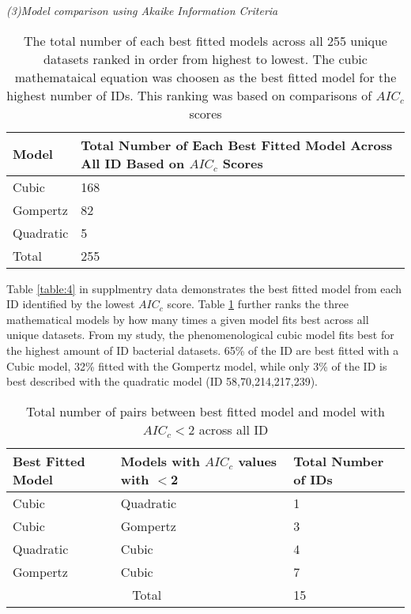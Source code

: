 \documentclass[11pt]{article}
\begin{document}
\noindent\emph{(3)Model comparison using Akaike Information Criteria}

    \begin{table}[htb]
        \caption{The total number of each best fitted models across all 255 unique datasets ranked in order from highest to lowest. The cubic mathemataical equation was
        choosen as the best fitted model for the highest number of IDs. This ranking was based on comparisons of $AIC_{c}$ scores}
        \centering 
        \begin{tabular}{ | m{3cm} | m{12em} | }
            \hline
            Model & Total Number of Each Best Fitted Model Across All ID Based on $AIC_{c}$ Scores \\
            \hline
            Cubic & 168 \\ 
            \hline
            Gompertz & 82 \\
            \hline
            Quadratic & 5 \\
            \hline
            Total & 255 \\
            \hline
        \end{tabular}
    \label{table:1}
    \end{table}  

Table \ref{table:4} in supplmentry data demonstrates the best fitted model from each ID identified by the lowest $AIC_{c}$ score. Table \ref{table:1} further ranks
the three mathematical models by how many times a given model fits best across all unique datasets. From my study, the phenomenological cubic 
model fits best for the highest amount of ID bacterial datasets. 65\% of the ID are best fitted with a Cubic model, 32\% fitted with the 
Gompertz model, while only 3\% of the ID is best described with the quadratic model (ID 58,70,214,217,239). 

    \begin{table}[htb]
        \caption{Total number of pairs between best fitted model and model with $AIC_{c}<$2 across all ID}
        \centering 
        \begin{tabular}{ | m{6em} | m{8em} | m{8em} |  }
            \hline
            Best Fitted Model & Models with $AIC_{c}$ values with $<$2 & Total Number of IDs \\
            \hline
            Cubic & Quadratic & 1 \\ 
            \hline
            Cubic & Gompertz & 3 \\
            \hline
            Quadratic & Cubic & 4 \\
            \hline
            Gompertz & Cubic & 7 \\
            \hline
            \multicolumn{2}{|c|}{Total} & 15 \\
            \hline
        \end{tabular}
    \label{table:2}
    \end{table}  
\end{document}
